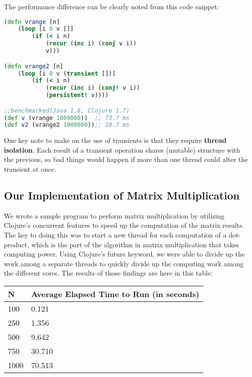     The performance difference can be clearly noted from this code snippet:
	\begin{lstlisting}[language=clojure]
(defn vrange [n]
	(loop [i 0 v []]
		(if (< i n)
			(recur (inc i) (conj v i))
			v)))

(defn vrange2 [n]
	(loop [i 0 v (transient [])]
		(if (< i n)
			(recur (inc i) (conj! v i))
			(persistent! v))))

;;benchmarked(Java 1.8, Clojure 1.7)
(def v (vrange 1000000))  ;; 73.7 ms
(def v2 (vrange2 1000000));; 19.7 ms
	\end{lstlisting}
    
    One key note to make on the use of transients is that they require \textbf{thread isolation}. Each result of a transient operation shares (mutable) structure with the previous, so bad things would happen if more than one thread could alter the transient at once. \cite{website:clojure-lang-reference}
    
\subsection{Our Implementation of Matrix Multiplication}

    We wrote a sample program to perform matrix multiplication by utilizing Clojure's concurrent features to speed up the computation of the matrix results. The key to doing this was to start a new thread for each computation of a dot-product, which is the part of the algorithm in matrix multiplication that takes computing power. Using Clojure's future keyword, we were able to divide up the work among a separate threads to quickly divide up the computing work among the different cores. The results of those findings are here in this table:
    
    \begin{center}
    \begin{tabular}{ | m{5em} | m{5cm}| }  
    \hline
    N & Average Elapsed Time to Run (in seconds) \\ [0.5ex] 
    \hline\hline
    100 & 0.121 \\ 
    \hline
    250 & 1.356 \\
    \hline
    500 & 9.642 \\
    \hline
    750 & 30.710 \\
    \hline
    1000 & 70.513 \\ [1ex] 
    \hline
    \end{tabular}
    \end{center}
    
